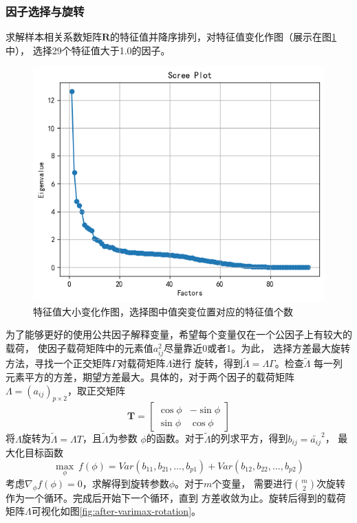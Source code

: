 \subsubsection{因子选择与旋转}
求解样本相关系数矩阵$\bm{R}$的特征值并降序排列，对特征值变化作图（展示在图\ref{fig:scree-plot}中），
选择29个特征值大于1.0的因子。
\begin{figure}[ht]
    \centering
    \includegraphics[width=.5\textwidth]{images/scree_plot.png}
    \caption{特征值大小变化作图，选择图中值突变位置对应的特征值个数}
    \label{fig:scree-plot}
\end{figure}
\par 为了能够更好的使用公共因子解释变量，希望每个变量仅在一个公因子上有较大的载荷，
使因子载荷矩阵中的元素值$a_{ij}^2$尽量靠近0或者1。为此，
选择方差最大旋转方法，寻找一个正交矩阵$\Gamma$对载荷矩阵$\Lambda$进行
旋转，得到$\tilde{\Lambda}=\Lambda\Gamma$。检查$\tilde{\Lambda}$
每一列元素平方的方差，期望方差最大。具体的，对于两个因子的载荷矩阵
$\Lambda = (a_{ij})_{p\times 2}$，取正交矩阵
\begin{equation*}
    \bm{T} =\left[
    \begin{array}{cc}
        \cos\phi & -\sin\phi \\
        \sin\phi & \cos\phi
    \end{array}
    \right]
\end{equation*}
将$\Lambda$旋转为$\tilde{\Lambda}=\Lambda T$，且$\tilde{\Lambda}$为参数
$\phi$的函数。对于$\tilde{\Lambda}$的列求平方，得到$b_{ij}=\tilde{a_{ij}}^2$，
最大化目标函数
\begin{equation*}
\max_{\phi} \ f(\phi)=Var(b_{11},b_{21},\ldots,b_{p1}) + Var(b_{12},b_{22},\ldots,b_{p2})
\end{equation*}
考虑$\nabla_{\phi}f(\phi)=0$，求解得到旋转参数$\phi$。对于$m$个变量，
需要进行$\binom{m}{2}$次旋转作为一个循环。完成后开始下一个循环，直到
方差收敛为止。旋转后得到的载荷矩阵$\Lambda$可视化如图\ref{fig:after-varimax-rotation}。
